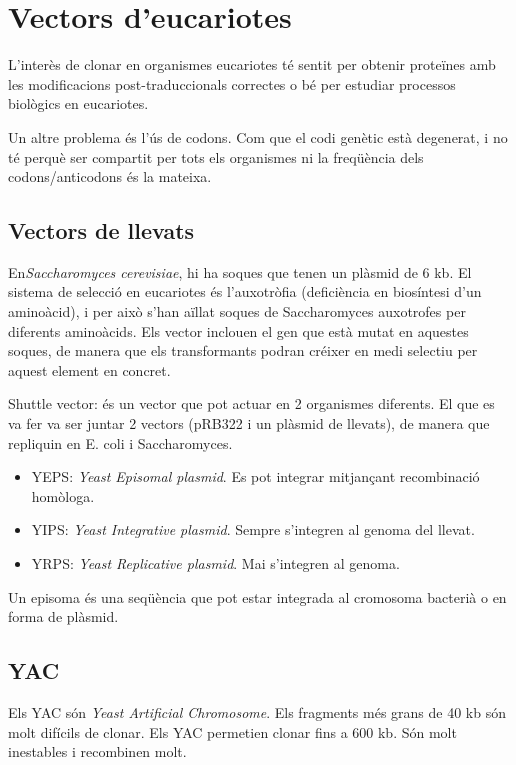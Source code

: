 
\section{Vectors d'eucariotes}
\label{sec:vectors-deucariotes}

L'interès de clonar en organismes eucariotes té sentit per obtenir proteïnes amb les modificacions post-traduccionals correctes o bé per estudiar processos biològics en eucariotes.

Un altre problema és l'ús de codons. Com que el codi genètic està degenerat, i no té perquè ser compartit per tots els organismes ni la freqüència dels codons/anticodons és la mateixa.

\subsection{Vectors de llevats}
\label{sec:vectors-de-llevats}
En\textit{Saccharomyces cerevisiae}, hi ha soques que tenen un plàsmid de 6 kb. El sistema de selecció en eucariotes és l'auxotròfia (deficiència en biosíntesi d'un aminoàcid), i per això s'han aïllat soques de Saccharomyces auxotrofes per diferents aminoàcids. Els vector inclouen el gen que està mutat en aquestes soques, de manera que els transformants podran créixer en medi selectiu per aquest element en concret.

Shuttle vector: és un vector que pot actuar en 2 organismes diferents. El que es va fer va ser juntar 2 vectors (pRB322 i un plàsmid de llevats), de manera que repliquin en E. coli i Saccharomyces.

\begin{itemize}
\item YEPS: \textit{Yeast Episomal plasmid}. Es pot integrar mitjançant recombinació homòloga.
\item YIPS: \textit{Yeast Integrative plasmid}. Sempre s'integren al genoma del llevat.
\item YRPS: \textit{Yeast Replicative plasmid}. Mai s'integren al genoma.
\end{itemize}

Un episoma és una seqüència que pot estar integrada al cromosoma bacterià o en forma de plàsmid.

\subsection{YAC}
\label{sec:yac}
Els YAC són \textit{Yeast Artificial Chromosome}. Els fragments més grans de 40 kb són molt difícils de clonar. Els YAC permetien clonar fins a 600 kb. Són molt inestables i recombinen molt.

